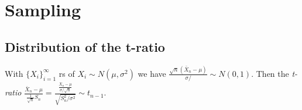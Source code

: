 \section{Sampling}
\subsection{Distribution of the t-ratio}
With $\{X_i\}_{i=1}^\infty$ rs of $X_i\sim N(\mu, \sigma^2)$ we have $\frac{\sqrt{n}(\bar{X}_n-\mu)}{\sigma/} \sim N(0,1)$. Then the \textit{t-ratio} $\frac{\bar{X}_n-\mu}{\frac{1}{\sqrt{n}}S_n} = \frac{\frac{\bar{X}_n-\mu}{\sigma/\sqrt{n}}}{\sqrt{S_n^2/\sigma^2}}\sim t_{n-1}$.\\